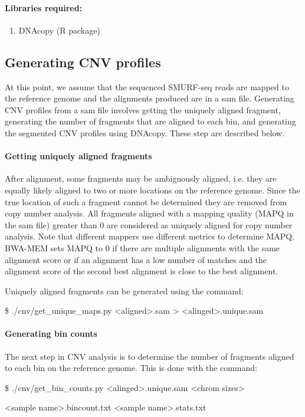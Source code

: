 \documentclass[11pt]{article}
\newenvironment{cmd}
{\list{}{
    \parsep=0em
    \itemindent=17pt
    \listparindent=50pt
    \leftmargin=0in
    \rightmargin=0in
  }\item[] \ttfamily \$}
{\endlist}
\begin{document}
\paragraph{Libraries required:}
\begin{enumerate}
  \item DNAcopy (R package) \cite{seshan2010dnacopy}
\end{enumerate}

\subsection{Generating CNV profiles}
At this point, we assume that the sequenced SMURF-seq reads are mapped to the
reference genome and the alignments produced are in a sam file.
Generating CNV profiles from a sam file involves getting the uniquely aligned
fragment, generating the number of fragments that are aligned to each bin, and
generating the segmented CNV profiles using DNAcopy. These step are described
below.

\paragraph{Getting uniquely aligned fragments}
After alignment, some fragments may be ambiguously aligned, i.e. they are
equally likely aligned to two or more locations on the reference genome.
Since the true location of such a fragment cannot be determined they are
removed from copy number analysis.
All fragments aligned with a mapping quality (MAPQ in the sam file) greater
than 0 are considered as uniquely aligned for copy number analysis.
Note that different mappers use different metrics to determine MAPQ. BWA-MEM
sets MAPQ to 0 if there are multiple alignments with the same alignment score
or if an alignment has a low number of matches and the alignment score of
the second best alignment is close to the best alignment.

Uniquely aligned fragments can be generated using the command:
\begin{cmd}
  ./cnv/get\_unique\_maps.py <aligned>.sam > <alinged>.unique.sam
\end{cmd}

\paragraph{Generating bin counts}
The next step in CNV analysis is to determine the number of fragments
aligned to each bin on the reference genome. This is done with the
command:
\begin{cmd}
  ./cnv/get\_bin\_counts.py <alinged>.unique.sam <chrom sizes>
    \par <bin boundaries> <sample name>.bincount.txt <sample name>.stats.txt
\end{cmd}
\end{document}
